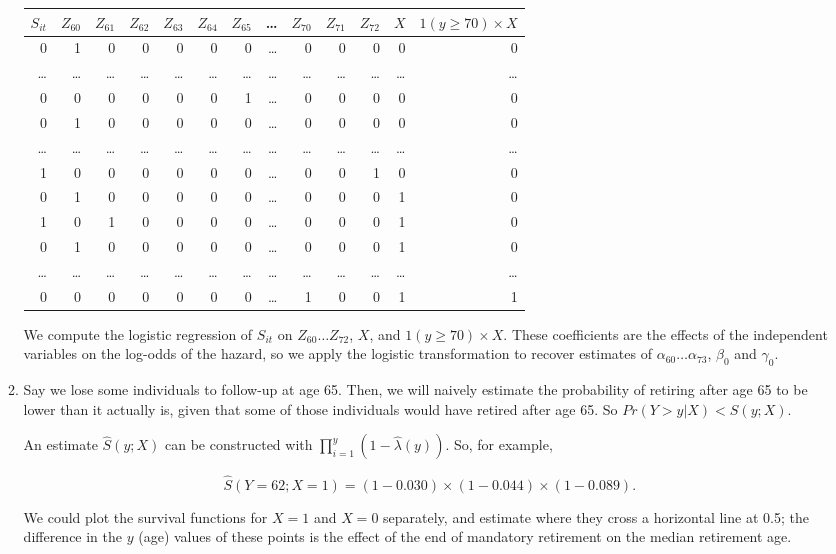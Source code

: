 \documentclass{article}
\begin{document}
\begin{enumerate}
\begin{enumerate}
		\begin{tabular}{ r r r r r r r r r r r r r} 
		  $S_{it}$ & $Z_{60}$ & $Z_{61}$ & $Z_{62}$ & $Z_{63}$ & $Z_{64}$ & $Z_{65}$ &\ldots & $Z_{70}$ & $Z_{71}$ & $Z_{72}$ & $X$ & $1(y\geq 70) \times X$ \\ \hline
		  0 & 1 & 0 & 0 & 0 & 0 & 0 & \ldots & 0 & 0 & 0 & 0 & 0 \\
		  \ldots & \ldots & \ldots & \ldots & \ldots & \ldots & \ldots & \ldots & \ldots & \ldots & \ldots & \ldots & \ldots \\
		  0 & 0 & 0 & 0 & 0 & 0 & 1 & \ldots & 0 & 0 & 0 & 0 & 0 \\ \hline
		  0 & 1 & 0 & 0 & 0 & 0 & 0 & \ldots & 0 & 0 & 0 & 0 & 0 \\
		  \ldots & \ldots & \ldots & \ldots & \ldots & \ldots & \ldots & \ldots & \ldots & \ldots & \ldots & \ldots & \ldots \\
		  1 & 0 & 0 & 0 & 0 & 0 & 0 & \ldots & 0 & 0 & 1 & 0 & 0 \\ \hline
		  0 & 1 & 0 & 0 & 0 & 0 & 0 & \ldots & 0 & 0 & 0 & 1 & 0 \\
		  1 & 0 & 1 & 0 & 0 & 0 & 0 & \ldots & 0 & 0 & 0 & 1 & 0 \\ \hline
		  0 & 1 & 0 & 0 & 0 & 0 & 0 & \ldots & 0 & 0 & 0 & 1 & 0 \\
		  \ldots & \ldots & \ldots & \ldots & \ldots & \ldots & \ldots & \ldots & \ldots & \ldots & \ldots & \ldots & \ldots \\
		  0 & 0 & 0 & 0 & 0 & 0 & 0 & \ldots & 1 & 0 & 0 & 1 & 1 \\

		\end{tabular}

		We compute the logistic regression of $S_{it}$ on $Z_{60}\ldots Z_{72}$, $X$, and $1(y\geq 70) \times X$. These coefficients are the effects of the independent variables on the log-odds of the hazard, so we apply the logistic transformation to recover estimates of $\alpha_{60} \ldots \alpha_{73}$, $\beta_0$ and $\gamma_0$.

		\item

		Say we lose some individuals to follow-up at age 65. Then, we will naively estimate the probability of retiring after age 65 to be lower than it actually is, given that some of those individuals would have retired after age 65. So $Pr(Y > y|X) < S(y; X)$.

		An estimate $\hat{S}(y;X)$ can be constructed with $\prod \limits_{i=1}^y (1-\hat{\lambda}(y))$. So, for example, 

		$$\hat{S}(Y=62;X=1) = (1 - 0.030) \times (1 - 0.044) \times (1 - 0.089).$$

		We could plot the survival functions for $X = 1$ and $X = 0$ separately, and estimate where they cross a horizontal line at 0.5; the difference in the $y$ (age) values of these points is the effect of the end of mandatory retirement on the median retirement age.

	\end{enumerate}

\end{enumerate}
\end{document}
